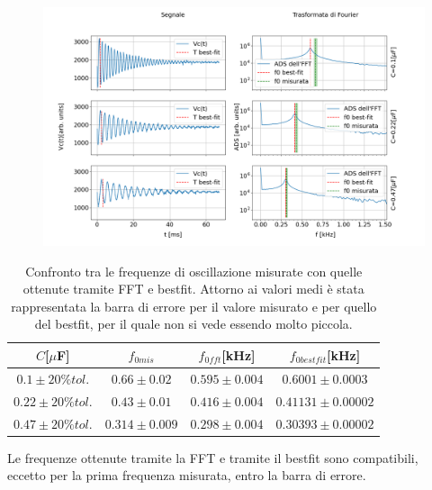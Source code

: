 \documentclass{article}
\begin{document}
        \begin{figure}[H]
            \centering
            \includegraphics[width=\textwidth]{FFT12/FFTRLC.png}
            \caption{}
            \label{fig:osc_smor}
        \end{figure}

        \begin{table}[H]
            \centering
            \caption{Confronto tra le frequenze di oscillazione misurate con quelle ottenute tramite FFT e bestfit.
                    Attorno ai valori medi è stata rappresentata la barra di errore per il valore
                    misurato e per quello del bestfit, per il quale non si vede essendo molto piccola.}
                \begin{tabular}{cccc}
                    $C$[$\mu$F]          &$f_{0mis}$                &   $f_{0fft}$[kHz]       & $f_{0bestfit}$[kHz] \\
                    \hline
                    $0.1 \pm 20\%tol.$   &     $0.66 \pm 0.02$      & $0.595 \pm 0.004$       & $0.6001 \pm 0.0003$ \\
                    $0.22 \pm 20\%tol.$  &$0.43 \pm 0.01$           & $0.416 \pm 0.004$       & $0.41131\pm 0.00002$ \\
                    $0.47 \pm 20\%tol.$  &$0.314 \pm 0.009 $        &$0.298 \pm 0.004$        & $0.30393\pm 0.00002$ \\
                \end{tabular}
                \label{tab:osc_smor}

        \end{table}
    
    Le frequenze ottenute tramite la FFT e tramite il bestfit sono compatibili, 
    eccetto per la prima frequenza misurata, entro la barra di errore.
\end{document}
